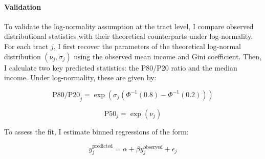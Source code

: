 \paragraph{Validation} To validate the log-normality assumption at the tract level, I compare observed distributional statistics with their theoretical counterparts under log-normality. For each tract $j$, I first recover the parameters of the theoretical log-normal distribution $(\nu_j, \sigma_j)$ using the observed mean income and Gini coefficient. Then, I calculate two key predicted statistics: the P80/P20 ratio and the median income. Under log-normality, these are given by:

\begin{equation}
\text{P80/P20}_j = \exp(\sigma_j(\Phi^{-1}(0.8) - \Phi^{-1}(0.2)))
\end{equation}

\begin{equation}
\text{P50}_j = \exp(\nu_j)
\end{equation}

To assess the fit, I estimate binned regressions of the form:

\begin{equation}
y_j^{\text{predicted}} = \alpha + \beta y_j^{\text{observed}} + \epsilon_j
\end{equation}

